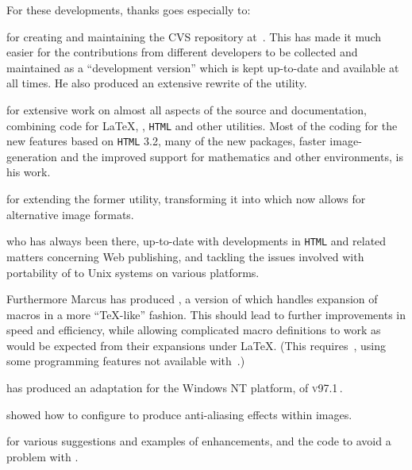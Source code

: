 \medskip\htmlrule[50\% center]
\noindent
For these developments, thanks goes especially to:
%
\begin{htmllist}
%
\item [\Lippman] 
for creating and maintaining the CVS repository at \CVSrepos\,.
This has made it much easier for the contributions from different developers
to be collected and maintained as a ``development version'' which
is kept up-to-date and available at all times. He also produced
an extensive rewrite of the  utility.


\item [\RossMoore] 
for extensive work on almost all aspects of the \latextohtml{} source
and documentation,
combining code for \LaTeX{}, \Perl{}, \texttt{HTML} and other utilities.
Most of the coding for the new features based on \texttt{HTML} 3.2,
many of the new packages, faster image-generation
and the improved support for mathematics
and other environments, is his work.


\item [\Rouchal] 
for extending the former  utility,
transforming it into  which now allows for
alternative image formats.


%
\item [\Hennecke] 
who has always been there, up-to-date with developments in \texttt{HTML} and
related matters concerning Web publishing,
and tackling the issues involved with portability
of \latextohtml{} to Unix systems on various platforms.

Furthermore Marcus has produced \latextohtmlNG, a version of
\latextohtml{} which handles expansion of macros in a more ``\TeX-like''
fashion. This should lead to further improvements in speed and efficiency,
while allowing complicated macro definitions to work as would be expected
from their expansions under \LaTeX.
(This requires \,,
using some programming features not available with \,.)%


\item [\Popineau]  has produced
an adaptation for the Windows NT platform, of \latextohtml{} \textsc{v97.1}\,.

\item [\Wortmann] 
showed how to configure  to produce
anti-aliasing effects within images.

\item [\AxelRamge] 
for various suggestions and examples of enhancements,
and the code to avoid a problem with .

\end{htmllist}

